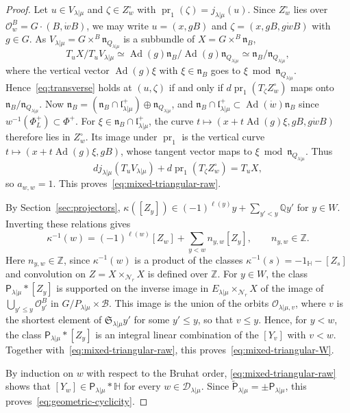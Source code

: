 \documentclass[11pt,a4paper]{amsart}
\theoremstyle{definition}
\theoremstyle{remark}
\newcommand{\Q}{\mathbb Q}
\newcommand{\N}{\mathcal N}
\newcommand{\B}{\mathcal B}
\newcommand{\bH}{\mathbb H}
\newcommand{\Ad}{\operatorname{Ad}}
\newcommand{\pr}{\operatorname{pr}}
\newcommand{\lm}{\lambda|\mu}
\numberwithin{equation}{section}
\begin{document}
\begin{proof}
Let $u\in V_{\lm}$ and $\zeta\in Z_w^\circ$ with $\pr_1(\zeta)=j_{\lm}(u)$.
Since $Z_w^\circ$ lies over $\mathcal O^B_w=G\cdot(B,\dot wB)$, we may write
$u=(x,gB)$ and $\zeta=(x,gB,g\dot wB)$ with $g\in G$. As
$V_{\lm}=G\times^B\mathfrak n_{Q_{\lm}}$ is a subbundle of
$X=G\times^B\mathfrak n_B$,
$$
T_uX/T_uV_{\lm}\simeq\Ad(g)\mathfrak n_B/\Ad(g)\mathfrak n_{Q_{\lm}}
\simeq\mathfrak n_B/\mathfrak n_{Q_{\lm}},
$$
where the vertical vector $\Ad(g)\xi$ with $\xi\in\mathfrak n_B$ goes to
$\xi\bmod\mathfrak n_{Q_{\lm}}$. Hence~\eqref{eq:transverse} holds at
$(u,\zeta)$ if and only if $d\pr_1(T_\zeta Z_w^\circ)$ maps onto
$\mathfrak n_B/\mathfrak n_{Q_{\lm}}$. Now
$\mathfrak n_B=(\mathfrak n_B\cap\mathfrak l^+_{\lm})\oplus\mathfrak n_{Q_{\lm}}$,
and $\mathfrak n_B\cap\mathfrak l^+_{\lm}\subset\Ad(\dot w)\mathfrak n_B$
since $w^{-1}(\Phi_L^+)\subset\Phi^+$. For
$\xi\in\mathfrak n_B\cap\mathfrak l^+_{\lm}$, the curve
$t\mapsto(x+t\Ad(g)\xi,gB,g\dot wB)$ therefore lies in $Z_w^\circ$. Its
image under $\pr_1$ is the vertical curve $t\mapsto(x+t\Ad(g)\xi,gB)$,
whose tangent vector maps to $\xi\bmod\mathfrak n_{Q_{\lm}}$. Thus
\begin{equation}\label{eq:middle-transversality}
dj_{\lm}(T_uV_{\lm})+d\pr_1(T_\zeta Z_w^\circ)=T_uX,
\end{equation}
so $a_{w,w}=1$. This proves~\eqref{eq:mixed-triangular-raw}.

By Section~\ref{sec:projectors},
$\kappa([Z_y])\in(-1)^{\ell(y)}y+\sum_{y'<y}\Q y'$ for $y\in W$. Inverting
these relations gives
$$
\kappa^{-1}(w)=(-1)^{\ell(w)}[Z_w]+\sum_{y<w}n_{y,w}[Z_y],
\qquad n_{y,w}\in\mathbb Z .
$$
Here $n_{y,w}\in\mathbb Z$, since $\kappa^{-1}(w)$ is a product of the
classes $\kappa^{-1}(s)=-1_{\bH}-[Z_s]$ and convolution on
$Z=X\times_{\N_r}X$ is defined over $\mathbb Z$.
For $y\in W$, the class $\mathsf P_{\lm}*[Z_y]$ is supported on the inverse
image in $E_{\lm}\times_{\N_r}X$ of the image of
$\bigcup_{y'\le y}\mathcal O^B_{y'}$ in $G/P_{\lm}\times\B$. This image is
the union of the orbits $\mathcal O_{\lm,v}$, where $v$ is the shortest
element of $\mathfrak S_{\lm}y'$ for some $y'\le y$, so that $v\le y$.
Hence, for $y<w$, the class $\mathsf P_{\lm}*[Z_y]$ is an integral linear
combination of the $[Y_v]$ with $v<w$. Together
with~\eqref{eq:mixed-triangular-raw}, this
proves~\eqref{eq:mixed-triangular-W}.

By induction on $w$ with respect to the Bruhat order,
\eqref{eq:mixed-triangular-raw} shows that $[Y_w]\in\mathsf P_{\lm}*\bH$
for every $w\in\mathcal D_{\lm}$. Since $\widetilde{\mathsf P}_{\lm}=\pm\mathsf P_{\lm}$, this
proves~\eqref{eq:geometric-cyclicity}.


\end{proof}
\end{document}
